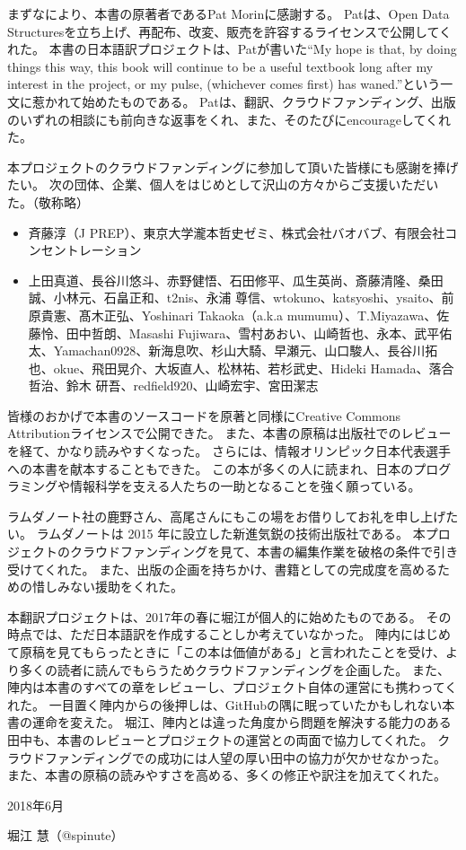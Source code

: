 まずなにより、本書の原著者であるPat Morinに感謝する。
Patは、Open Data Structuresを立ち上げ、再配布、改変、販売を許容するライセンスで公開してくれた。
本書の日本語訳プロジェクトは、Patが書いた``My hope is that, by doing things this way, this book will continue to be a useful textbook long after my interest in the project, or my pulse, (whichever comes first) has waned.''という一文に惹かれて始めたものである。
Patは、翻訳、クラウドファンディング、出版のいずれの相談にも前向きな返事をくれ、また、そのたびにencourageしてくれた。

本プロジェクトのクラウドファンディングに参加して頂いた皆様にも感謝を捧げたい。
次の団体、企業、個人をはじめとして沢山の方々からご支援いただいた。（敬称略） %
\begin{itemize}
\item 斉藤淳（J PREP）、東京大学瀧本哲史ゼミ、株式会社バオバブ、有限会社コンセントレーション
\item 上田真道、長谷川悠斗、赤野健悟、石田修平、瓜生英尚、斎藤清隆、桑田誠、小林元、石畠正和、t2nis、永浦 尊信、wtokuno、katsyoshi、ysaito、前原貴憲、髙木正弘、Yoshinari Takaoka（a.k.a mumumu）、T.Miyazawa、佐藤怜、田中哲朗、Masashi Fujiwara、雪村あおい、山崎哲也、永本、武平佑太、Yamachan0928、新海息吹、杉山大騎、早瀬元、山口駿人、長谷川拓也、okue、飛田晃介、大坂直人、松林祐、若杉武史、Hideki Hamada、落合哲治、鈴木 研吾、redfield920、山崎宏宇、宮田潔志
\end{itemize}

皆様のおかげで本書のソースコードを原著と同様にCreative Commons Attributionライセンスで公開できた。
また、本書の原稿は出版社でのレビューを経て、かなり読みやすくなった。
さらには、情報オリンピック日本代表選手への本書を献本することもできた。
この本が多くの人に読まれ、日本のプログラミングや情報科学を支える人たちの一助となることを強く願っている。

ラムダノート社の鹿野さん、高尾さんにもこの場をお借りしてお礼を申し上げたい。
ラムダノートは 2015 年に設立した新進気鋭の技術出版社である。
本プロジェクトのクラウドファンディングを見て、本書の編集作業を破格の条件で引き受けてくれた。
また、出版の企画を持ちかけ、書籍としての完成度を高めるための惜しみない援助をくれた。

本翻訳プロジェクトは、2017年の春に堀江が個人的に始めたものである。
その時点では、ただ日本語訳を作成することしか考えていなかった。
陣内にはじめて原稿を見てもらったときに「この本は価値がある」と言われたことを受け、より多くの読者に読んでもらうためクラウドファンディングを企画した。
また、陣内は本書のすべての章をレビューし、プロジェクト自体の運営にも携わってくれた。
一目置く陣内からの後押しは、GitHubの隅に眠っていたかもしれない本書の運命を変えた。
堀江、陣内とは違った角度から問題を解決する能力のある田中も、本書のレビューとプロジェクトの運営との両面で協力してくれた。
クラウドファンディングでの成功には人望の厚い田中の協力が欠かせなかった。
また、本書の原稿の読みやすさを高める、多くの修正や訳注を加えてくれた。

\noindent\hspace*{2em}
2018年6月

\hfill 堀江 慧（@spinute）
